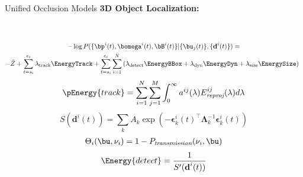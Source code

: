 \documentclass[handout,final]{beamer}
\newcommand{\Ptransmission}{P_{\textit{transmission}}}%
\newcommand{\bepsilon}{{\bm{\epsilon}}}
\newcommand{\meandepth}[1]{\nu_#1}
\newcommand{\bLambda}{\bm{\Lambda}}
\newlength{\onecolwid}
\begin{document}
\begin{frame}[t]
\begin{columns}[t]
\begin{column}{\onecolwid}
\begin{block}{Unified Occlusion Models}
	  \textbf{3D Object Localization:}
		\begin{figure}
			\newcommand{\imagewidth}{18cm}
		      \hspace{-0.8cm}
		     \\
		      \hspace{-0.8cm}
		            
        \end{figure}	
        \begin{multline*}
          -\log{P(\{ \bp^i(t) , \bomega^i(t) , \bB^i(t) \} | \{\bu_j(t)\} , \{\textbf{d}^i(t)\} )} = \\
          -\tilde{Z} 
          + \sum_{t=s_i}^{e_i} \lambda_{\text{track}}\EnergyTrack
          +  
          \sum_{t=s_i}^{e_i} \sum_{i=1}^N  
          \left(
            \lambda_{\text{detect}}\EnergyBBox
            + \lambda_{\text{dyn}}\EnergyDyn    
            + \lambda_{\text{size}}\EnergySize
          \right)
          \enspace
        \end{multline*}        
        \begin{align}
		  \pEnergy{track} = \sum_{i=1}^{N} \sum_{j = 1}^{M} \int_0^\infty a^{ij}(\lambda) E^{ij}_{\textit{reproj}}(\lambda) d\lambda
		\end{align}        
        \begin{equation}
			S(\textbf{d}^i(t)) = \sum_k A_k \exp \left( -\bepsilon_k^{i}(t)^\top \bLambda_k^{-1} \bepsilon_k^{i}(t) \right)
		\end{equation}		
		\begin{align}
		  \Theta_{i}(\bu, \meandepth{i}) = 1 - \Ptransmission(\meandepth{i}, \bu)
		\end{align}		
		\begin{align}
		  \Energy{detect} = \frac{1}{S'(\textbf{d}^i(t))}
		\end{align}
        
                


\end{block}
\end{column}
\end{columns}
\end{frame}
\end{document}
